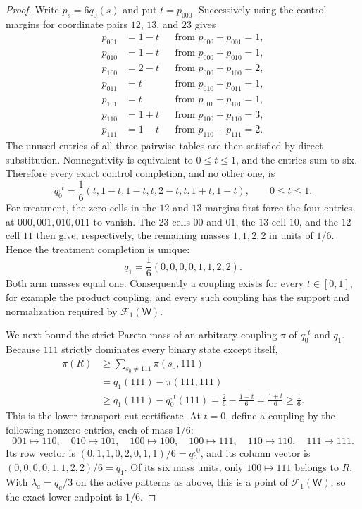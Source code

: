 \documentclass{article}
\begin{document}
\begin{proof}
Write \(p_s=6q_0(s)\) and put \(t=p_{000}\).  Successively using the control margins for coordinate pairs \(12\), \(13\), and \(23\) gives
\[
\begin{aligned}
p_{001}&=1-t &&\text{from }p_{000}+p_{001}=1,\\
p_{010}&=1-t &&\text{from }p_{000}+p_{010}=1,\\
p_{100}&=2-t &&\text{from }p_{000}+p_{100}=2,\\
p_{011}&=t   &&\text{from }p_{010}+p_{011}=1,\\
p_{101}&=t   &&\text{from }p_{001}+p_{101}=1,\\
p_{110}&=1+t &&\text{from }p_{100}+p_{110}=3,\\
p_{111}&=1-t &&\text{from }p_{110}+p_{111}=2.
\end{aligned}
\]
The unused entries of all three pairwise tables are then satisfied by direct substitution.  Nonnegativity is equivalent to \(0\le t\le1\), and the entries sum to six.  Therefore every exact control completion, and no other one, is
\[
q_0^{,t}=\frac{1}{6}(t,1-t,1-t,t,2-t,t,1+t,1-t),
\qquad 0\le t\le1.
\]
For treatment, the zero cells in the \(12\) and \(13\) margins first force the four entries at \(000,001,010,011\) to vanish.  The \(23\) cells \(00\) and \(01\), the \(13\) cell \(10\), and the \(12\) cell \(11\) then give, respectively, the remaining masses \(1,1,2,2\) in units of \(1/6\).  Hence the treatment completion is unique:
\[
q_1=\frac{1}{6}(0,0,0,0,1,1,2,2).
\]
Both arm masses equal one.  Consequently a coupling exists for every \(t\in[0,1]\), for example the product coupling, and every such coupling has the support and normalization required by \(\mathcal F_1(\mathsf W)\).

We next bound the strict Pareto mass of an arbitrary coupling \(\pi\) of \(q_0^{,t}\) and \(q_1\).  Because \(111\) strictly dominates every binary state except itself,
\[
\begin{aligned}
\pi(R)
&\ge \sum_{s_0\ne111}\pi(s_0,111)\\
&=q_1(111)-\pi(111,111)\\
&\ge q_1(111)-q_0^{,t}(111)
=\frac{2}{6}-\frac{1-t}{6}
=\frac{1+t}{6}
\ge\frac16.
\end{aligned}
\]
This is the lower transport-cut certificate.  At \(t=0\), define a coupling by the following nonzero entries, each of mass \(1/6\):
\[
001\mapsto110,
\quad010\mapsto101,
\quad100\mapsto100,
\quad100\mapsto111,
\quad110\mapsto110,
\quad111\mapsto111.
\]
Its row vector is \((0,1,1,0,2,0,1,1)/6=q_0^{,0}\), and its column vector is \((0,0,0,0,1,1,2,2)/6=q_1\).  Of its six mass units, only \(100\mapsto111\) belongs to \(R\).  With \(\lambda_a=q_a/3\) on the active patterns as above, this is a point of \(\mathcal F_1(\mathsf W)\), so the exact lower endpoint is \(1/6\).


\end{proof}
\end{document}
